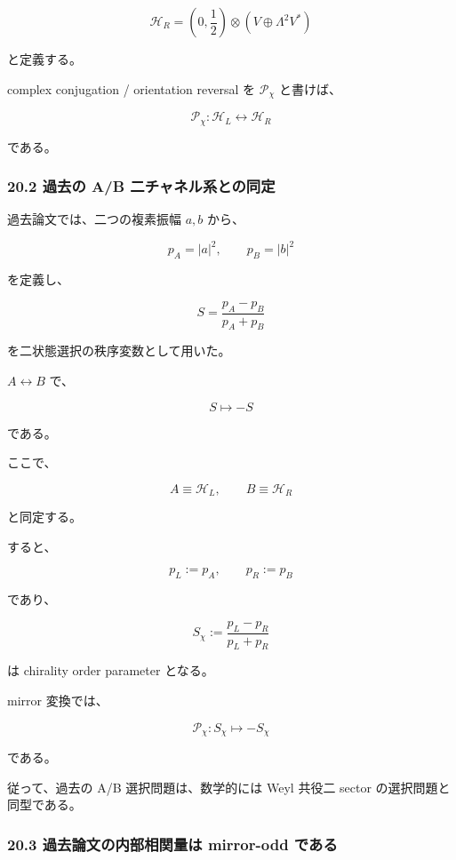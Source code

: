 \documentclass[
  a4paper,
]{ltjsarticle}
\begin{document}
\[
\boxed{
\mathcal H_R
=
\left(0,\frac12\right)
\otimes
\left(
V\oplus\Lambda^2V^*
\right)
}
\tag{149}
\]

と定義する。

complex conjugation / orientation reversal を \(\mathcal P_\chi\)
と書けば、

\[
\boxed{
\mathcal P_\chi:
\mathcal H_L
\leftrightarrow
\mathcal H_R
}
\tag{150}
\]

である。

\subsubsection{20.2 過去の A/B
二チャネル系との同定}\label{ux904eux53bbux306e-ab-ux4e8cux30c1ux30e3ux30cdux30ebux7cfbux3068ux306eux540cux5b9a}

過去論文では、二つの複素振幅 \(a,b\) から、

\[
p_A=|a|^2,
\qquad
p_B=|b|^2
\]

を定義し、

\[
\boxed{
S
=
\frac{p_A-p_B}{p_A+p_B}
}
\tag{151}
\]

を二状態選択の秩序変数として用いた。

\(A\leftrightarrow B\) で、

\[
\boxed{
S\mapsto-S
}
\tag{152}
\]

である。

ここで、

\[
\boxed{
A\equiv\mathcal H_L,
\qquad
B\equiv\mathcal H_R
}
\tag{153}
\]

と同定する。

すると、

\[
p_L:=p_A,
\qquad
p_R:=p_B
\]

であり、

\[
\boxed{
S_\chi
:=
\frac{p_L-p_R}{p_L+p_R}
}
\tag{154}
\]

は chirality order parameter となる。

mirror 変換では、

\[
\boxed{
\mathcal P_\chi:
S_\chi\mapsto-S_\chi
}
\tag{155}
\]

である。

従って、過去の A/B 選択問題は、数学的には Weyl 共役二 sector
の選択問題と同型である。

\subsubsection{20.3 過去論文の内部相関量は mirror-odd
である}\label{ux904eux53bbux8ad6ux6587ux306eux5185ux90e8ux76f8ux95a2ux91cfux306f-mirror-odd-ux3067ux3042ux308b}
\end{document}
